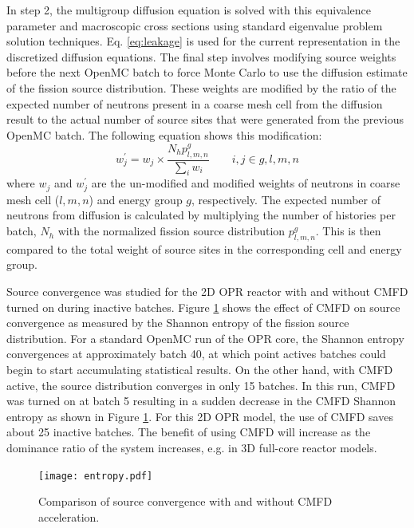 \documentclass{ansconf}
\begin{document}
In step 2, the multigroup diffusion equation is solved with this equivalence
parameter and macroscopic cross sections using standard eigenvalue problem
solution techniques. Eq. \eqref{eq:leakage} is used for the current representation in 
the discretized diffusion equations. The final step involves modifying source weights 
before the next OpenMC batch to force Monte Carlo to use the diffusion estimate of the
fission source distribution. These weights are modified by the ratio of the
expected number of neutrons present in a coarse mesh cell from the diffusion
result to the actual number of source sites that were generated from the
previous OpenMC batch. The following equation shows this modification:
\begin{equation}
  \label{eq:weight}
  w_{j}^{\prime} = w_{j} \times \frac{N_{h}p_{l,m,n}^{g}}{\sum_{i}w_{i}} \qquad
  i,j\in g,l,m,n
\end{equation}
where $w_{j}$ and $w_{j}^{\prime}$ are the un-modified and modified weights of
neutrons in coarse mesh cell ($l,m,n$) and energy group $g$, respectively. The
expected number of neutrons from diffusion is calculated by multiplying the
number of histories per batch, $N_{h}$ with the normalized fission source
distribution $p_{l,m,n}^{g}$. This is then compared to the total weight of source
sites in the corresponding cell and energy group.

Source convergence was studied for the 2D OPR reactor with and without CMFD
turned on during inactive batches.  Figure \ref{fig:cmfd} shows the effect of
CMFD on source convergence as measured by the Shannon entropy of the fission
source distribution. For a standard OpenMC run of the OPR core, the Shannon
entropy convergences at approximately batch 40, at which point actives batches
could begin to start accumulating statistical results. On the other hand, with
CMFD active, the source distribution converges in only 15 batches. In this run,
CMFD was turned on at batch 5 resulting in a sudden decrease in the CMFD Shannon
entropy as shown in Figure \ref{fig:cmfd}. For this 2D OPR model, the use of CMFD
saves about 25 inactive batches. The benefit of using CMFD will increase as the
dominance ratio of the system increases, e.g. in 3D full-core reactor models.

\begin{figure}[!t]
  \centering
  \texttt{[image: entropy.pdf]}
  \caption{Comparison of source convergence with and without CMFD acceleration.}
  \label{fig:cmfd}
\end{figure}  
\end{document}
